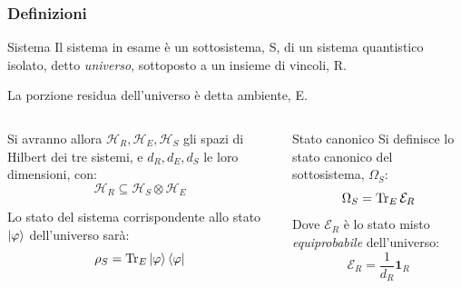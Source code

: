 \documentclass[10pt]{beamer}	%
\theoremstyle{definition}
\theoremstyle{plain}
\begin{document}
\begin{frame}
	\frametitle{Definizioni}
	
	\begin{block}{Sistema}
		Il sistema in esame è un sottosistema, S, di un sistema quantistico isolato, detto \textit{universo}, sottoposto a un insieme di vincoli, R.
		
		La porzione residua dell'universo è detta ambiente, E.
	\end{block}
	\begin{columns}
		\pause
		\begin{column}{0.5\textwidth}
			Si avranno allora $\mathcal{H}_R, \mathcal{H}_E, \mathcal{H}_S$ gli spazi di Hilbert dei tre sistemi, e $d_R, d_E, d_S$ le loro dimensioni, con:
			\begin{equation*}
			\mathcal{H}_R \subseteq \mathcal{H}_S \otimes \mathcal{H}_E
			\end{equation*}
			
			Lo stato del sistema corrispondente allo stato $\ket{\varphi}$ dell'universo sarà:
			\begin{equation*}
			\rho_S = \Tr_E \ket{\varphi}\bra{\varphi}
			\end{equation*}
		\end{column}
		\pause
		\begin{column}{0.5\textwidth}
			\begin{block}{Stato canonico}
				Si definisce lo stato canonico del sottosistema, $\Omega_S$:
				\begin{equation*}
				\Omega_S = \Tr_E \mathcal{E}_R
				\end{equation*}
				Dove $\mathcal{E}_R$ è lo stato misto \textit{equiprobabile} dell'universo:
				\begin{equation*}
				\mathcal{E}_R = \frac{1}{d_R} \mathbf{1}_R
				\end{equation*}
			\end{block}
		\end{column}
	\end{columns}
	
\end{frame}
\end{document}

